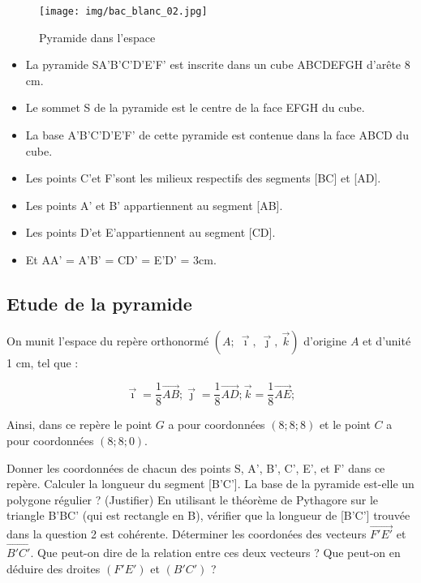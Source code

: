 \documentclass{exam}
\begin{document}
\begin{figure}[H]
  \centering
  \texttt{[image: img/bac\_blanc\_02.jpg]}
  \caption{\label{} Pyramide dans l'espace}
\end{figure}

\begin{itemize}[noitemsep]
  \item La pyramide SA'B'C'D'E'F' est inscrite dans un cube ABCDEFGH d'arête 8 cm.
  \item Le sommet S de la pyramide est le centre de la face EFGH du cube.
  \item La base A'B'C'D'E'F' de cette pyramide est contenue dans la face ABCD du cube.
  \item Les points C'et F'sont les milieux respectifs des segments [BC] et [AD].
  \item Les points A' et B' appartiennent au segment [AB].
  \item Les points D'et E'appartiennent au segment [CD].
  \item Et AA' = A'B' = CD' = E'D' = 3cm.
\end{itemize}

\subsection*{Etude de la pyramide}

On munit l'espace du repère orthonormé $\left(A\mathpunct{} ; \ \vec{\imath}\mathpunct{}, \ \vec{\jmath}\mathpunct{}, \ \vec{k}\right)$ d'origine $A$ et d'unité 1 cm, tel que :

\[
  \vec{\imath} = \frac{1}{8} \overrightarrow{AB} ; 
  \vec{\jmath} = \frac{1}{8} \overrightarrow{AD} ; 
  \vec{k} = \frac{1}{8} \overrightarrow{AE} ;
\]

Ainsi, dans ce repère le point $G$ a pour coordonnées $(8; 8; 8)$ et le point $C$ a pour coordonnées $(8 ; 8 ; 0)$.


\begin{questions}
  \question[1.5] Donner les coordonnées de chacun des points S, A', B', C', E', et F' dans ce repère.
  \question[1] Calculer la longueur du segment [B'C']. La base de la pyramide est-elle un polygone régulier ? (Justifier)
  \question[1] En  utilisant le théorème de Pythagore sur le triangle B'BC' (qui est rectangle en B), vérifier que la longueur de [B'C'] trouvée dans la question 2 est cohérente.
  \question[1.5] Déterminer les coordonées des vecteurs $\overrightarrow{F'E'}$ et $\overrightarrow{B'C'}$. Que peut-on dire de la relation entre ces deux vecteurs ? Que peut-on en déduire des droites $(F'E')$ et $(B'C')$ ?
\end{questions}
\end{document}
